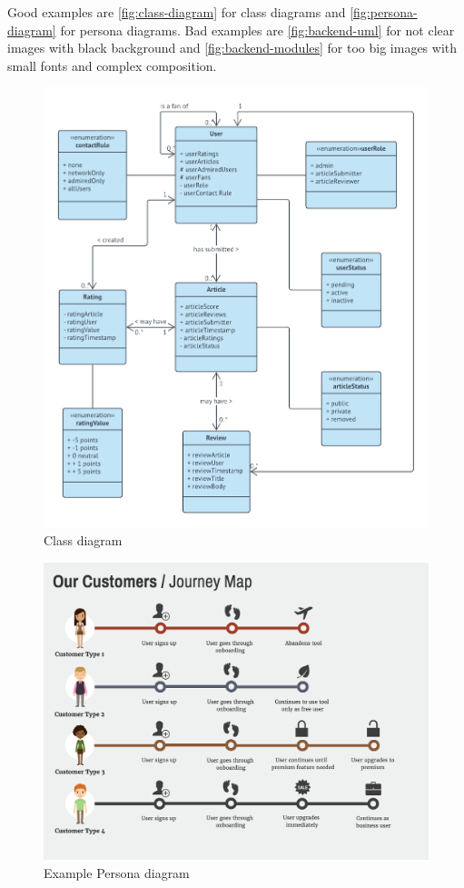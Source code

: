 \documentclass[12pt,a4paper]{article}
\begin{document}
\begin{spacing}{1.5}
    Good examples are \autoref{fig:class-diagram} for class diagrams and
    \autoref{fig:persona-diagram} for persona diagrams. Bad examples are
    \autoref{fig:backend-uml} for not clear images with black background and
    \autoref{fig:backend-modules} for too big images with small fonts and complex
    composition.
    \begin{figure}[H]
        \centering
        \includegraphics[width=1\linewidth]{assets/class_diagram.png}
        \caption{Class diagram}
        \label{fig:class-diagram}
    \end{figure}
    \FloatBarrier

    \begin{figure}[H]
        \centering
        \includegraphics[width=1\linewidth]{assets/persona-diagram-example.png}
        \caption{Example Persona diagram}
        \label{fig:persona-diagram}
    \end{figure}
    \FloatBarrier


\end{spacing}
\end{document}

